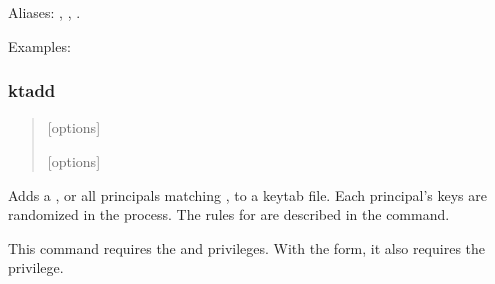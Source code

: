 \documentclass[letterpaper,10pt,english]{sphinxmanual}
\begin{document}
Aliases: , , .

Examples:

%
\begin{sphinxVerbatim}[commandchars=\\\{\}]
  

   
\end{sphinxVerbatim}


\subsubsection{ktadd}
\label{\detokenize{admin/admin_commands/kadmin_local:ktadd}}\label{\detokenize{admin/admin_commands/kadmin_local:id17}}\begin{quote}

\begin{DUlineblock}{0em}
\item[]  {[}options{]} 
\item[]  {[}options{]}  
\end{DUlineblock}
\end{quote}

Adds a , or all principals matching , to a
keytab file.  Each principal’s keys are randomized in the process.
The rules for  are described in the 
command.

This command requires the  and  privileges.
With the  form, it also requires the  privilege.
\end{document}
